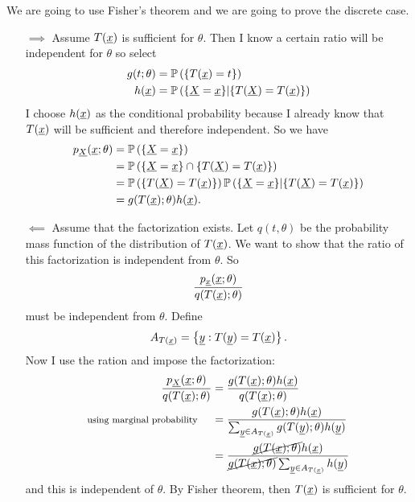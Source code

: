 \documentclass[12pt]{report}
\begin{document}
\begin{fancyproof}
	We are going to use Fisher's theorem and we are going to prove the discrete case.
	\begin{enumerate}
		\item[$\implies$] Assume $T(\underline{x})$ is sufficient for $\theta$. Then I know a certain ratio will be independent for $\theta$ so select
		\begin{align*}
			g(t;\theta) & =\mathbb{P}\left(\{T(\underline{x})=t\}\right) \\
			h(\underline{x}) & =\mathbb{P}\left(\{\underline{X}=\underline{x}\}|\{T(\underline{X})=T(\underline{x})\}\right)
		\end{align*}
		I choose $h(\underline{x})$ as the conditional probability because I already know that $T(\underline{x})$ will be sufficient and therefore independent. So we have
		\begin{align*}
			p_{\underline{X}}(\underline{x};\theta)&=\mathbb{P}\left(\{\underline{X}=\underline{x}\}\right)\\
			&=\mathbb{P}\left(\{\underline{X}=\underline{x}\}\cap\{T(\underline{X})=T(\underline{x})\}\right)\\
			&=\mathbb{P}\left(\{T(\underline{X})=T(\underline{x})\}\right)\mathbb{P}\left(\{\underline{X}=\underline{x}\}|\{T(\underline{X})=T(\underline{x})\}\right)\\
			&=g(T(\underline{x});\theta)h(\underline{x}).
		\end{align*}
		\item[$\impliedby$] Assume that the factorization exists. Let $q(t,\theta)$ be the probability mass function of the distribution of $T(\underline{x})$. We want to show that the ratio of this factorization is independent from $\theta$. So
		\begin{equation*}
			\frac{p_{\underline{x}}(\underline{x};\theta)}{q(T(\underline{x});\theta)}
		\end{equation*}
		must be independent from $\theta$. Define
		\begin{equation*}
			A_{T(\underline{x})}=\left\{\underline{y}:T(\underline{y})=T(\underline{x})\right\}.
		\end{equation*}
	Now I use the ration and impose the factorization:
	\begin{align*}
		\frac{p_{\underline{X}}(\underline{x};\theta)}{q(T(\underline{x});\theta)}&=\frac{g(T(\underline{x});\theta)h(\underline{x})}{q(T(\underline{x});\theta)}\\
		\text{\footnotesize using marginal probability }\quad&=\frac{g(T(\underline{x});\theta)h(\underline{x})}{\sum_{\underline{y}\in A_{T(\underline{x})}}g(T(\underline{y});\theta)h(\underline{y})}\\
		&=\frac{\cancel{g(T(\underline{x});\theta)}h(\underline{x})}{\cancel{g(T(\underline{x});\theta)}\sum_{\underline{y}\in A_{T(\underline{x})}}h(\underline{y})}
	\end{align*}
	and this is independent of $\theta$. By Fisher theorem, then $T(\underline{x})$ is sufficient for $\theta$.
	\end{enumerate}
\end{fancyproof}
\end{document}
